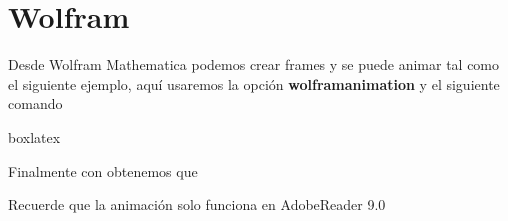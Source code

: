 {	\section{Wolfram}
	Desde Wolfram Mathematica podemos crear frames y se puede animar tal como el siguiente ejemplo, aquí usaremos la opción \textbf{wolframanimation} y el siguiente comando
	\begin{tcblisting}{boxlatex}
	\end{tcblisting}
	Finalmente con obtenemos que
	\begin{figure}[H]
		\centering
	\end{figure}
	\begin{boxbasic}
		Recuerde que la animación solo funciona en AdobeReader 9.0
	\end{boxbasic}
	}
